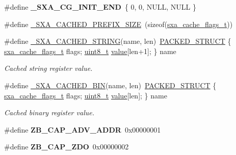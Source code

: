 \begin{DoxyCompactItemize}
\item 
\hypertarget{group___s_x_a_ga77fd70a084eb4c9fcb54902d1237c40a}{\#define {\bfseries \-\_\-\-S\-X\-A\-\_\-\-C\-G\-\_\-\-I\-N\-I\-T\-\_\-\-E\-N\-D}~\{ 0, 0, N\-U\-L\-L, N\-U\-L\-L \}}\label{group___s_x_a_ga77fd70a084eb4c9fcb54902d1237c40a}

\item 
\#define \hyperlink{group___s_x_a_ga0deca0e430c1eeb8d4719574d1331900}{\-\_\-\-S\-X\-A\-\_\-\-C\-A\-C\-H\-E\-D\-\_\-\-P\-R\-E\-F\-I\-X\-\_\-\-S\-I\-Z\-E}~(sizeof(\hyperlink{group___s_x_a_ga21b45e50d83fcc1363c4239313e88c06}{sxa\-\_\-cache\-\_\-flags\-\_\-t}))
\item 
\#define \hyperlink{group___s_x_a_ga43c6a2c7e1b5ee83edc039a248412580}{\-\_\-\-S\-X\-A\-\_\-\-C\-A\-C\-H\-E\-D\-\_\-\-S\-T\-R\-I\-N\-G}(name, len)~\hyperlink{group___s_x_a_ga4233297bd31be5c273d4fb0758cc54d7}{P\-A\-C\-K\-E\-D\-\_\-\-S\-T\-R\-U\-C\-T} \{ \hyperlink{group___s_x_a_ga21b45e50d83fcc1363c4239313e88c06}{sxa\-\_\-cache\-\_\-flags\-\_\-t} flags; \hyperlink{group__hal_gae1affc9ca37cfb624959c866a73f83c2}{uint8\-\_\-t} \hyperlink{group__zcl_ga1ed5b151a90f7e99af8cca2e6875ddf4}{value}\mbox{[}len+1\mbox{]}; \} name
\begin{DoxyCompactList}\small\item\em Cached string register value. \end{DoxyCompactList}\item 
\#define \hyperlink{group___s_x_a_gaa0c4e5507161ec6f607d737e4d949a0b}{\-\_\-\-S\-X\-A\-\_\-\-C\-A\-C\-H\-E\-D\-\_\-\-B\-I\-N}(name, len)~\hyperlink{group___s_x_a_ga4233297bd31be5c273d4fb0758cc54d7}{P\-A\-C\-K\-E\-D\-\_\-\-S\-T\-R\-U\-C\-T} \{ \hyperlink{group___s_x_a_ga21b45e50d83fcc1363c4239313e88c06}{sxa\-\_\-cache\-\_\-flags\-\_\-t} flags; \hyperlink{group__hal_gae1affc9ca37cfb624959c866a73f83c2}{uint8\-\_\-t} \hyperlink{group__zcl_ga1ed5b151a90f7e99af8cca2e6875ddf4}{value}\mbox{[}len\mbox{]}; \} name
\begin{DoxyCompactList}\small\item\em Cached binary register value. \end{DoxyCompactList}\item 
\hypertarget{group___s_x_a_gaa7956981f26959da78a1394c2ad65c4d}{\#define {\bfseries Z\-B\-\_\-\-C\-A\-P\-\_\-\-A\-D\-V\-\_\-\-A\-D\-D\-R}~0x00000001}\label{group___s_x_a_gaa7956981f26959da78a1394c2ad65c4d}

\item 
\hypertarget{group___s_x_a_gaa2470002554608a36463a2f19ddf96f4}{\#define {\bfseries Z\-B\-\_\-\-C\-A\-P\-\_\-\-Z\-D\-O}~0x00000002}\label{group___s_x_a_gaa2470002554608a36463a2f19ddf96f4}


\end{DoxyCompactItemize}
